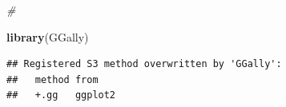 \documentclass[
]{article}
\newenvironment{Shaded}{\begin{snugshade}}{\end{snugshade}}
\newcommand{\CommentTok}[1]{\textcolor[rgb]{0.56,0.35,0.01}{\textit{#1}}}
\newcommand{\FunctionTok}[1]{\textcolor[rgb]{0.13,0.29,0.53}{\textbf{#1}}}
\newcommand{\NormalTok}[1]{#1}
\begin{document}
\begin{Shaded}
\begin{Highlighting}[]
\CommentTok{\#}
\end{Highlighting}
\end{Shaded}

\newpage

\begin{Shaded}
\begin{Highlighting}[]
\FunctionTok{library}\NormalTok{(GGally)}
\end{Highlighting}
\end{Shaded}

\begin{verbatim}
## Registered S3 method overwritten by 'GGally':
##   method from   
##   +.gg   ggplot2
\end{verbatim}
\end{document}
